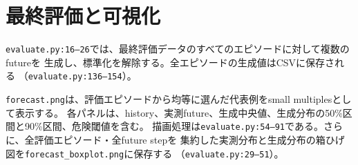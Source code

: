\documentclass[a4paper,11pt]{bxjsarticle}
\begin{document}
\section{最終評価と可視化}
\texttt{evaluate.py:16--26}では、最終評価データのすべてのエピソードに対して複数のfutureを
生成し、標準化を解除する。全エピソードの生成値はCSVに保存される
（\texttt{evaluate.py:136--154}）。

\texttt{forecast.png}は、評価エピソードから均等に選んだ代表例をsmall multiplesとして表示する。
各パネルは、history、実測future、生成中央値、生成分布の50\%区間と90\%区間、危険閾値を含む。
描画処理は\texttt{evaluate.py:54--91}である。さらに、全評価エピソード・全future stepを
集約した実測分布と生成分布の箱ひげ図を\texttt{forecast\_boxplot.png}に保存する
（\texttt{evaluate.py:29--51}）。
\end{document}
